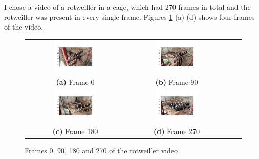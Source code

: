 \documentclass[11pt]{article}
\begin{document}
I chose a video of a rotweiller in a cage, which had 270 frames in total and the rotweiller was present in every single frame. Figures \ref{fig:q_6_3} (a)-(d) shows four frames of the video.

\begin{figure}[h!]
    \centering
    \begin{tabular}{cccc}
    
    \includegraphics[width=0.45\textwidth]{figures/q_6_3_rot0.png}  &  \includegraphics[width=0.45\textwidth]{figures/q_6_3_rot89.png}  \\  
    \textbf{(a)} Frame 0 & \textbf{(b)} Frame 90\\ [6pt] 

    \includegraphics[width=0.45\textwidth]{figures/q_6_3_rot179.png}  &  \includegraphics[width=0.45\textwidth]{figures/q_6_3_rot269.png}  \\  
    \textbf{(c)} Frame 180 & \textbf{(d)} Frame 270\\ [6pt] 

    \end{tabular}
    \caption{Frames 0, 90, 180 and 270 of the rotweiller video}\label{fig:q_6_3}
\end{figure} 
\end{document}
